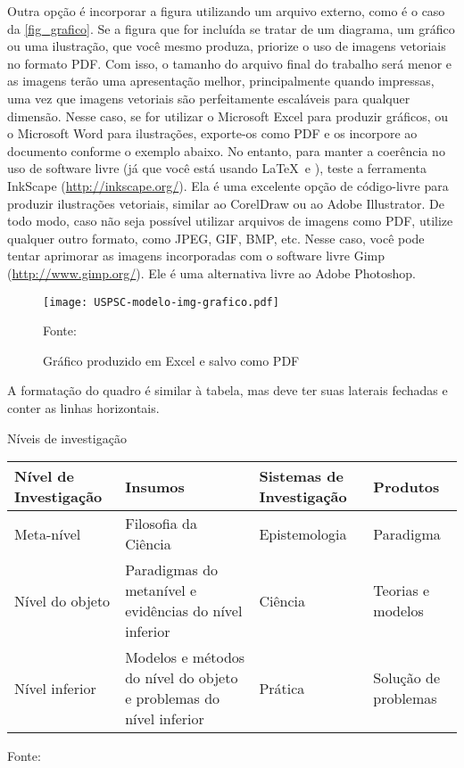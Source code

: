 Outra opção é incorporar a figura utilizando um arquivo externo, como é o caso da \autoref{fig_grafico}. Se a figura que for incluída se tratar de um diagrama, um gráfico ou uma ilustração, que você mesmo produza, priorize o uso de imagens vetoriais no formato PDF. Com isso, o tamanho do arquivo final do trabalho será menor e as imagens terão uma apresentação melhor, principalmente quando impressas, uma vez que imagens vetoriais são perfeitamente escaláveis para qualquer dimensão. Nesse caso, se for utilizar o Microsoft Excel para produzir gráficos, ou o Microsoft Word para ilustrações, exporte-os como PDF e os incorpore ao documento conforme o exemplo abaixo. No entanto, para manter a
coerência no uso de software livre (já que você está usando \LaTeX\  e \abnTeX),
teste a ferramenta \textsf{InkScape}
(\url{http://inkscape.org/}). Ela é uma excelente opção de código-livre para
produzir ilustrações vetoriais, similar ao CorelDraw ou ao Adobe
Illustrator. De todo modo, caso não seja possível
utilizar arquivos de imagens como PDF, utilize qualquer outro formato, como
JPEG, GIF, BMP, etc. Nesse caso, você pode tentar aprimorar as imagens
incorporadas com o software livre \textsf{Gimp}
(\url{http://www.gimp.org/}). Ele é uma alternativa livre ao Adobe
Photoshop. \\

\begin{figure}[H]
	\caption{\label{fig_grafico}Gráfico produzido em Excel e salvo como PDF}
	\texttt{[image: USPSC-modelo-img-grafico.pdf]}
	\begin{flushleft}
		Fonte: 
	\end{flushleft}	
\end{figure}


A formatação do quadro é similar à tabela, mas deve ter suas laterais fechadas e conter as linhas horizontais.


\begin{quadro}[htb]
	\caption{\label{quadro_modelo}Níveis de investigação}
	\begin{tabular}{|p{2.6cm}|p{6.0cm}|p{2.25cm}|p{3.40cm}|}
		\hline
		\textbf{Nível de Investigação} & \textbf{Insumos}  & \textbf{Sistemas de Investigação}  & \textbf{Produtos}  \\
		\hline
		Meta-nível & Filosofia\index{filosofia} da Ciência  & Epistemologia &
		Paradigma  \\
		\hline
		Nível do objeto & Paradigmas do metanível e evidências do nível inferior &
		Ciência  & Teorias e modelos \\
		\hline
		Nível inferior & Modelos e métodos do nível do objeto e problemas do nível inferior & Prática & Solução de problemas  \\
		\hline
	\end{tabular}
	\begin{flushleft}
		Fonte: \citeonline{van1986}
	\end{flushleft}
\end{quadro} 


